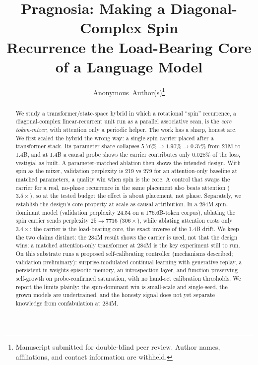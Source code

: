 \documentclass[journal]{IEEEtran}
\begin{document}
\title{Pragnosia: Making a Diagonal-Complex Spin\\ Recurrence the Load-Bearing Core of a Language Model}

\author{Anonymous~Author(s)\thanks{Manuscript submitted for double-blind peer review. Author names, affiliations, and contact information are withheld.}}


\maketitle

\begin{abstract}
We study a transformer/state-space hybrid in which a rotational ``spin'' recurrence, a diagonal-complex linear-recurrent unit run as a parallel associative scan, is the \emph{core token-mixer}, with attention only a periodic helper. The work has a sharp, honest arc. We first scaled the hybrid the wrong way: a single spin carrier placed after a transformer stack. Its parameter share collapses $5.76\% \to 1.90\% \to 0.37\%$ from 21M to 1.4B, and at 1.4B a causal probe shows the carrier contributes only 0.028\% of the loss, vestigial as built. A parameter-matched ablation then shows the intended design. With spin as the mixer, validation perplexity is 219 vs 279 for an attention-only baseline at matched parameters, a quality win when spin is the core. A control that swaps the carrier for a real, no-phase recurrence in the same placement also beats attention ($3.5\times$), so at the tested budget the effect is about placement, not phase. Separately, we establish the design's core property at scale as causal attribution. In a 284M spin-dominant model (validation perplexity 24.54 on a 176.6B-token corpus), ablating the spin carrier sends perplexity $25 \to 7716$ ($306\times$), while ablating attention costs only $3.4\times$: the carrier is the load-bearing core, the exact inverse of the 1.4B drift. We keep the two claims distinct: the 284M result shows the carrier is used, not that the design wins; a matched attention-only transformer at 284M is the key experiment still to run. On this substrate runs a proposed self-calibrating controller (mechanisms described; validation preliminary): surprise-modulated continual learning with generative replay, a persistent in-weights episodic memory, an introspection layer, and function-preserving self-growth on probe-confirmed saturation, with no hand-set calibration thresholds. We report the limits plainly: the spin-dominant win is small-scale and single-seed, the grown models are undertrained, and the honesty signal does not yet separate knowledge from confabulation at 284M.
\end{abstract}
\end{document}
